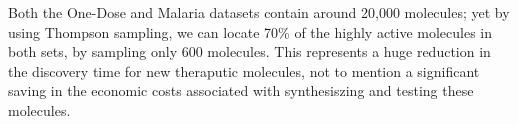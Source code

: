 Both the One-Dose and Malaria datasets contain around 20,000 molecules; yet by using Thompson sampling, we can locate 70\% of the highly active molecules in both sets, by sampling only 600 molecules. This represents a huge reduction in the discovery time for new theraputic molecules, not to mention a significant saving in the economic costs associated with synthesiszing and testing these molecules.
